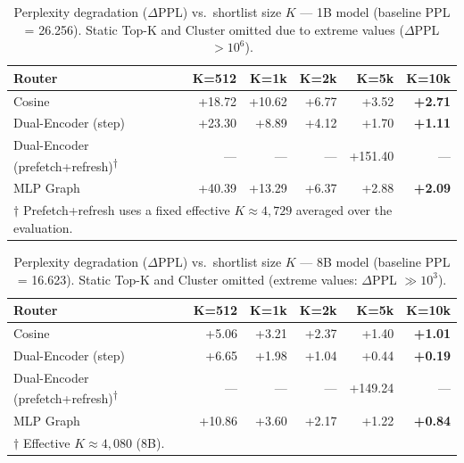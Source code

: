 \documentclass[twocolumn,10pt]{article}
\newcommand{\tblhead}[1]{\textbf{#1}}
\begin{document}
\begin{table}[t]
\centering
\caption{Perplexity degradation ($\Delta$PPL) vs.\ shortlist size $K$ --- 1B model (baseline PPL = 26.256).
         Static Top-K and Cluster omitted due to extreme values
         ($\Delta$PPL $> 10^6$).}
\label{tab:ppl}
\small
\begin{tabular}{@{}lrrrrr@{}}
\toprule
\tblhead{Router} & \tblhead{K=512} & \tblhead{K=1k} & \tblhead{K=2k} & \tblhead{K=5k} & \tblhead{K=10k} \\
\midrule
Cosine                          & +18.72 & +10.62 & +6.77 & +3.52 & \textbf{+2.71} \\
Dual-Encoder (step)             & +23.30 & +8.89  & +4.12 & +1.70 & \textbf{+1.11} \\
Dual-Encoder (prefetch+refresh)\textsuperscript{$\dagger$} & --- & --- & --- & +151.40 & --- \\
MLP Graph                       & +40.39 & +13.29 & +6.37 & +2.88 & \textbf{+2.09} \\
\bottomrule
\multicolumn{6}{l}{\footnotesize $\dagger$ Prefetch+refresh uses a fixed
  effective $K{\approx}4{,}729$ averaged over the evaluation.}
\end{tabular}
\end{table}

\begin{table}[t]
\centering
\caption{Perplexity degradation ($\Delta$PPL) vs.\ shortlist size $K$ --- 8B model (baseline PPL = 16.623).
         Static Top-K and Cluster omitted (extreme values: $\Delta$PPL $\gg 10^3$).}
\label{tab:ppl-8b}
\small
\begin{tabular}{@{}lrrrrr@{}}
\toprule
\tblhead{Router} & \tblhead{K=512} & \tblhead{K=1k} & \tblhead{K=2k} & \tblhead{K=5k} & \tblhead{K=10k} \\
\midrule
Cosine                          & +5.06 & +3.21 & +2.37 & +1.40 & \textbf{+1.01} \\
Dual-Encoder (step)             & +6.65 & +1.98 & +1.04 & +0.44 & \textbf{+0.19} \\
Dual-Encoder (prefetch+refresh)\textsuperscript{$\dagger$} & --- & --- & --- & +149.24 & --- \\
MLP Graph                       & +10.86 & +3.60 & +2.17 & +1.22 & \textbf{+0.84} \\
\bottomrule
\multicolumn{6}{l}{\footnotesize $\dagger$ Effective $K{\approx}4{,}080$ (8B).}
\end{tabular}
\end{table}
\end{document}
